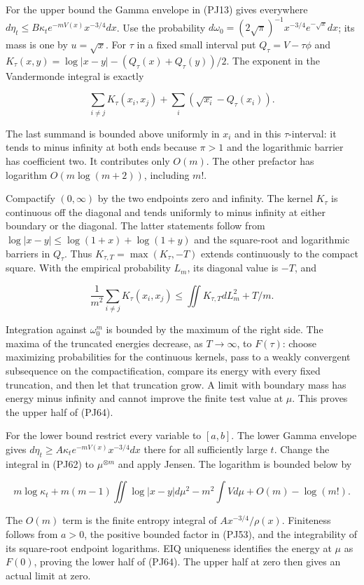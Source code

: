 \documentclass[10pt]{article}
\begin{document}
For the upper bound the Gamma envelope in (PJ13) gives everywhere \(d\eta_t\le B\kappa_t e^{-mV(x)}x^{-3/4}dx\). Use the probability \(d\omega_0=(2\sqrt\pi)^{-1}x^{-3/4}e^{-\sqrt{x}}dx\); its mass is one by \(u=\sqrt x\). For \(\tau\) in a fixed small interval put \(Q_\tau=V-\tau\phi\) and \(K_\tau(x,y)=\log|x-y|-(Q_\tau(x)+Q_\tau(y))/2\). The exponent in the Vandermonde integral is exactly

\[
\sum_{i\ne j}K_\tau(x_i,x_j)
+\sum_i(\sqrt{x_i}-Q_\tau(x_i)).
\]

The last summand is bounded above uniformly in \(x_i\) and in this \(\tau\)-interval: it tends to minus infinity at both ends because \(\pi>1\) and the logarithmic barrier has coefficient two. It contributes only \(O(m)\). The other prefactor has logarithm \(O(m\log(m+2))\), including \(m!\).

Compactify \((0,\infty)\) by the two endpoints zero and infinity. The kernel \(K_\tau\) is continuous off the diagonal and tends uniformly to minus infinity at either boundary or the diagonal. The latter statements follow from \(\log|x-y|\le\log(1+x)+\log(1+y)\) and the square-root and logarithmic barriers in \(Q_\tau\). Thus \(K_{\tau,T}=\max(K_\tau,-T)\) extends continuously to the compact square. With the empirical probability \(L_m\), its diagonal value is \(-T\), and

\[
\frac1{m^2}\sum_{i\ne j}K_\tau(x_i,x_j)
\le\iint K_{\tau,T}dL_m^2+T/m.
\]

Integration against \(\omega_0^m\) is bounded by the maximum of the right side. The maxima of the truncated energies decrease, as \(T\to\infty\), to \(F(\tau)\): choose maximizing probabilities for the continuous kernels, pass to a weakly convergent subsequence on the compactification, compare its energy with every fixed truncation, and then let that truncation grow. A limit with boundary mass has energy minus infinity and cannot improve the finite test value at \(\mu\). This proves the upper half of (PJ64).

For the lower bound restrict every variable to \([a,b]\). The lower Gamma envelope gives \(d\eta_t\ge A\kappa_t e^{-mV(x)}x^{-3/4}dx\) there for all sufficiently large \(t\). Change the integral in (PJ62) to \(\mu^{\otimes m}\) and apply Jensen. The logarithm is bounded below by

\[
m\log\kappa_t+m(m-1)\iint\log|x-y|d\mu^2
-m^2\int Vd\mu+O(m)-\log(m!).
\]

The \(O(m)\) term is the finite entropy integral of \(Ax^{-3/4}/\rho(x)\). Finiteness follows from \(a>0\), the positive bounded factor in (PJ53), and the integrability of its square-root endpoint logarithms. EIQ uniqueness identifies the energy at \(\mu\) as \(F(0)\), proving the lower half of (PJ64). The upper half at zero then gives an actual limit at zero.
\end{document}
